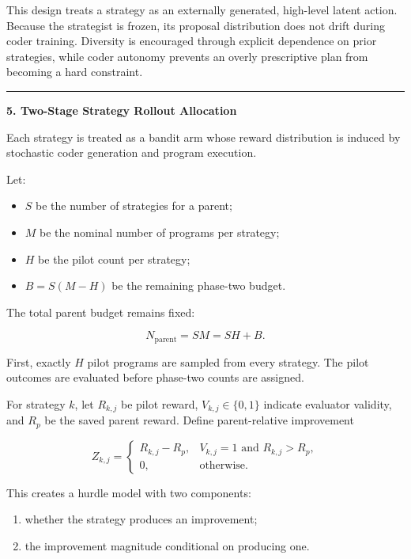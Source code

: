\documentclass[
]{article}
\providecommand{\tightlist}{%
  \setlength{\itemsep}{0pt}\setlength{\parskip}{0pt}}
\begin{document}
This design treats a strategy as an externally generated, high-level
latent action. Because the strategist is frozen, its proposal
distribution does not drift during coder training. Diversity is
encouraged through explicit dependence on prior strategies, while coder
autonomy prevents an overly prescriptive plan from becoming a hard
constraint.

\begin{center}\rule{0.5\linewidth}{0.5pt}\end{center}

\textbf{5. Two-Stage Strategy Rollout Allocation}

Each strategy is treated as a bandit arm whose reward distribution is
induced by stochastic coder generation and program execution.

Let:

\begin{itemize}
\tightlist
\item
  \(S\) be the number of strategies for a parent;
\item
  \(M\) be the nominal number of programs per strategy;
\item
  \(H\) be the pilot count per strategy;
\item
  \(B=S(M-H)\) be the remaining phase-two budget.
\end{itemize}

The total parent budget remains fixed:

\[
N_{\mathrm{parent}}=SM=SH+B.
\]

First, exactly \(H\) pilot programs are sampled from every strategy. The
pilot outcomes are evaluated before phase-two counts are assigned.

For strategy \(k\), let \(R_{k,j}\) be pilot reward,
\(V_{k,j}\in\{0,1\}\) indicate evaluator validity, and \(R_p\) be the
saved parent reward. Define parent-relative improvement

\[
Z_{k,j}
=
\begin{cases}
R_{k,j}-R_p,
&
V_{k,j}=1
\text{ and }R_{k,j}>R_p,\\[1mm]
0,
&
\text{otherwise}.
\end{cases}
\]

This creates a hurdle model with two components:

\begin{enumerate}
\def\labelenumi{\arabic{enumi}.}
\tightlist
\item
  whether the strategy produces an improvement;
\item
  the improvement magnitude conditional on producing one.
\end{enumerate}
\end{document}

